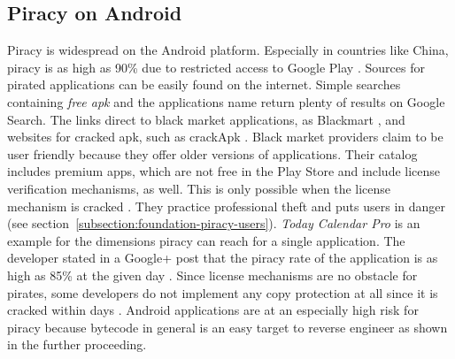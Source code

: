 \subsection{Piracy on Android} \label{subsection:foundation-piracy-android}
Piracy is widespread on the Android platform. Especially in countries like China, piracy is as high as 90\% due to restricted access to Google Play \cite{piracyRate}.
Sources for pirated applications can be easily found on the internet.
Simple searches containing \textit{free apk} and the applications name return plenty of results on Google Search.
The links direct to black market applications, as Blackmart \cite{blackmartStore}, and websites for cracked \gls{apk}, such as crackApk \cite{crackApk}.
Black market providers claim to be user friendly because they offer older versions of applications.
Their catalog includes premium apps, which are not free in the Play Store and include license verification mechanisms, as well.
This is only possible when the license mechanism is cracked \cite{apksfree}.
They practice professional theft and puts users in danger (see section~\ref{subsection:foundation-piracy-users}).
\newline
\textit{Today Calendar Pro} is an example for the dimensions piracy can reach for a single application.
The developer stated in a Google+ post that the piracy rate of the application is as high as 85\% at the given day \cite{xdaPiracy} \cite{developersPiracy}.
\newline
Since license mechanisms are no obstacle for pirates, some developers do not implement any copy protection at all since it is cracked within days \cite{recodeMonument}.
Android applications are at an especially high risk for piracy because bytecode in general is an easy target to reverse engineer as shown in the further proceeding.
